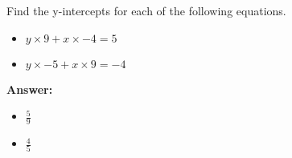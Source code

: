  Find the y-intercepts for each of the following equations. \begin{itemize}\item \( y \times 9 + x \times -4 = 5 \)\item \( y \times -5 + x \times 9 = -4 \)\end{itemize}

        \textbf{Answer:} \begin{itemize}\item \( \frac{5}{9} \)\item \( \frac{4}{5} \)\end{itemize}
